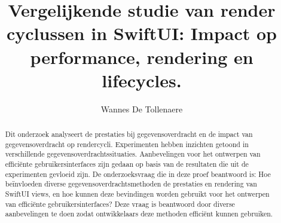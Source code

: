 \documentclass[a0,portrait]{hogent-poster}
\title{Vergelijkende studie van render cyclussen
    in SwiftUI: Impact op performance,
    rendering en lifecycles.}
\author{Wannes De Tollenaere}
\begin{document}
\maketitle

\begin{abstract}
Dit onderzoek analyseert de prestaties bij gegevensoverdracht en de impact van gegevensoverdracht op rendercycli. Experimenten hebben inzichten getoond in verschillende gegevensoverdrachtssituaties. Aanbevelingen voor het ontwerpen van efficiënte gebruikersinterfaces zijn gedaan op basis van de resultaten die uit de experimenten gevloeid zijn. De onderzoeksvraag die in deze proef beantwoord is: Hoe beïnvloeden diverse gegevensoverdrachtsmethoden de prestaties en rendering van SwiftUI views, en hoe kunnen deze bevindingen worden gebruikt voor het ontwerpen van efficiënte gebruikersinterfaces? Deze vraag is beantwoord door diverse aanbevelingen te doen zodat ontwikkelaars deze methoden efficiënt kunnen gebruiken. 
\end{abstract}
\end{document}
